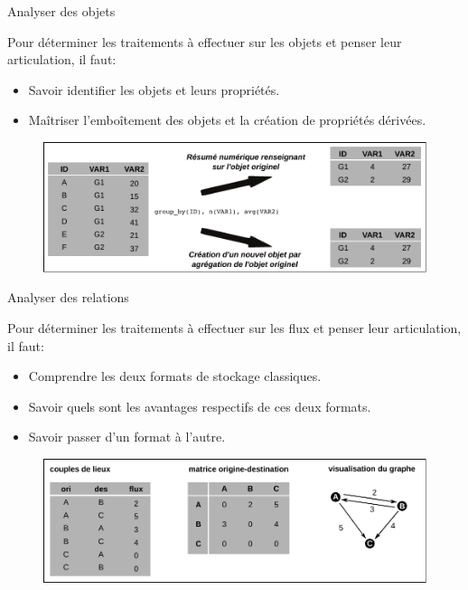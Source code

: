 \documentclass{beamer}
\begin{document}
\begin{frame}{Analyser des objets}

Pour déterminer les traitements à effectuer sur les objets et penser leur articulation, il faut:

\begin{itemize}
  \item Savoir identifier les objets et leurs propriétés. 
  \item Maîtriser l'emboîtement des objets et la création de propriétés dérivées.
\end{itemize}

\begin{figure}
  \includegraphics[width=12cm]{AnalyseObjets.pdf}
\end{figure}

\end{frame}


\begin{frame}{Analyser des relations}

Pour déterminer les traitements à effectuer sur les flux et penser leur articulation, il faut:

\begin{itemize}
  \item Comprendre les deux formats de stockage classiques. 
  \item Savoir quels sont les avantages respectifs de ces deux formats.
  \item Savoir passer d'un format à l'autre.
\end{itemize}

\begin{figure}
  \includegraphics[width=12cm]{AnalyseRelations.pdf}
\end{figure}

\end{frame}
\end{document}
